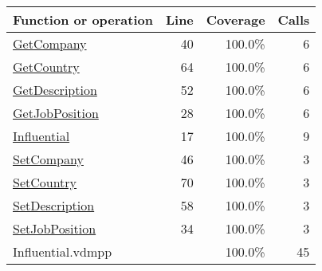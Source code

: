\bigskip
\begin{longtable}{|l|r|r|r|}
\hline
Function or operation & Line & Coverage & Calls \\
\hline
\hline
\hyperref[GetCompany:40]{GetCompany} & 40&100.0\% & 6 \\
\hline
\hyperref[GetCountry:64]{GetCountry} & 64&100.0\% & 6 \\
\hline
\hyperref[GetDescription:52]{GetDescription} & 52&100.0\% & 6 \\
\hline
\hyperref[GetJobPosition:28]{GetJobPosition} & 28&100.0\% & 6 \\
\hline
\hyperref[Influential:17]{Influential} & 17&100.0\% & 9 \\
\hline
\hyperref[SetCompany:46]{SetCompany} & 46&100.0\% & 3 \\
\hline
\hyperref[SetCountry:70]{SetCountry} & 70&100.0\% & 3 \\
\hline
\hyperref[SetDescription:58]{SetDescription} & 58&100.0\% & 3 \\
\hline
\hyperref[SetJobPosition:34]{SetJobPosition} & 34&100.0\% & 3 \\
\hline
\hline
Influential.vdmpp & & 100.0\% & 45 \\
\hline
\end{longtable}

